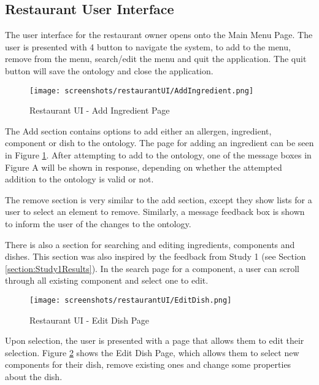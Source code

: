 \subsection{Restaurant User Interface}

The user interface for the restaurant owner opens onto the Main Menu Page. The user is presented with 4 button to navigate the system, to add to the menu, remove from the menu, search/edit the menu and quit the application. The quit button will save the ontology and close the application.

\begin{figure}[h]
    \centering
    \captionsetup{justification=centering}
    \texttt{[image: screenshots/restaurantUI/AddIngredient.png]}
    \caption{Restaurant UI - Add Ingredient Page}
    \label{fig:restaurantUI_add_ing_page}
\end{figure}

The Add section contains options to add either an allergen, ingredient, component or dish to the ontology. The page for adding an ingredient can be seen in Figure \ref{fig:restaurantUI_add_ing_page}. After attempting to add to the ontology, one of the message boxes in Figure A will be shown in response, depending on whether the attempted addition to the ontology is valid or not.

The remove section is very similar to the add section, except they show lists for a user to select an element to remove. Similarly, a message feedback box is shown to inform the user of the changes to the ontology.

There is also a section for searching and editing ingredients, components and dishes. This section was also inspired by the feedback from Study 1 (see Section \ref{section:Study1Results}). In the search page for a component, a user can scroll through all existing component and select one to edit.

\begin{figure}[h]
    \centering
    \captionsetup{justification=centering}
    \texttt{[image: screenshots/restaurantUI/EditDish.png]}
    \caption{Restaurant UI - Edit Dish Page}
    \label{fig:restaurantUI_edit_dish}
\end{figure}

Upon selection, the user is presented with a page that allows them to edit their selection. Figure \ref{fig:restaurantUI_edit_dish} shows the Edit Dish Page, which allows them to select new components for their dish, remove existing ones and change some properties about the dish.

